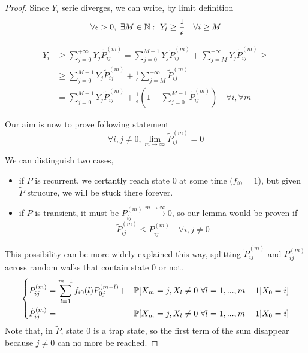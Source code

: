 \begin{proof}
		\proofpart \label{part:Yi_lower_bound}
			Since $Y_i$ serie diverges, we can write, by limit definition
			$$ \forall \epsilon > 0, ~\exists M \in \mathbb{N} : ~Y_i \ge \frac{1}{\epsilon} \quad \forall i \ge M$$

			\begin{equation}\begin{split}
				Y_i & \ge \sum_{j=0}^{+\infty} Y_j \tilde{P}_{ij}^{(m)}
					= \sum_{j=0}^{M-1} Y_j \tilde{P}_{ij}^{(m)}
					+ \sum_{j=M}^{+\infty} Y_j \tilde{P}_{ij}^{(m)} \ge \\
				& \ge \sum_{j=0}^{M-1} Y_j \tilde{P}_{ij}^{(m)}
					+ \frac{1}{\epsilon} \sum_{j=M}^{+\infty} \tilde{P}_{ij}^{(m)} \\
				& = \sum_{j=0}^{M-1} Y_j \tilde{P}_{ij}^{(m)}
					+ \frac{1}{\epsilon} \left( 1 - \sum_{j=0}^{M-1}\tilde{P}_{ij}^{(m)} \right) \quad \forall i, \forall m
			\end{split}\end{equation}

		\proofpart
			Our aim is now to prove following statement
			$$ \forall i,j \neq 0, \lim_{m \to \infty} \tilde{P}_{ij}^{(m)} = 0 $$

			We can distinguish two cases,
			\begin{itemize}
				\item if $P$ is recurrent, we certantly reach state 0 at some time ($f_{i0} = 1$), but given $\tilde{P}$ strucure, we will be stuck there forever.
				\item if $P$ is transient, it must be $P_{ij}^{(m)}\stackrel{m \to \infty}{\longrightarrow} 0 $, so our lemma would be proven if
				$$ \tilde{P}_{ij}^{(m)} \le P_{ij}^{(m)} \quad\forall i, j \neq 0$$
			\end{itemize}

			This possibility can be more widely explained this way, splitting $\tilde{P}_{ij}^{(m)}$ and $P_{ij}^{(m)}$ across random walks	 that contain state 0 or not.
			\begin{equation}
				\left\{ \begin{split}
					& P_{ij}^{(m)} = \sum_{l=1}^{m-1} f_{i0}(l) P_{0j}^{(m-l)} +
						& \mathbb{P}[X_m = j, X_l \neq 0 ~ \forall l = 1, ..., m-1 | X_0 = i] \\
					& \tilde{P}_{ij}^{(m)} =
						& \mathbb{P}[X_m = j, X_l \neq 0 ~ \forall l = 1, ..., m-1 | X_0 = i] \\
				\end{split} \right.
			\end{equation}
			Note that, in $\tilde{P}$, state $0$ is a trap state, so the first term of the sum disappear because $j \neq 0$ can no more be reached.


\end{proof}
